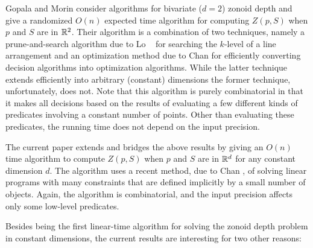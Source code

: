 \documentclass[lotsofwhite]{patmorin}
\begin{document}
Gopala and Morin \cite{gm06} consider algorithms for bivariate ($d=2$)
zonoid depth and give a randomized $O(n)$ expected time algorithm for
computing $Z(p,S)$ when $p$ and $S$ are in $\mathbb{R}^2$.  Their algorithm is
a combination of two techniques, namely a prune-and-search algorithm
due to Lo \etal\ \cite{lms94} for searching the $k$-level of a line
arrangement and an optimization method due to Chan \cite{c99} for
efficiently converting decision algorithms into optimization
algorithms.   While the latter technique extends efficiently into
arbitrary (constant) dimensions \cite{c04} the former technique,
unfortunately, does not.  Note that this algorithm is purely
combinatorial in that it makes all decisions based on the results of
evaluating a few different kinds of predicates involving a constant
number of points. Other than evaluating these predicates, the running
time does not depend on the input precision.

The current paper extends and bridges the above results by giving an
$O(n)$ time algorithm to compute $Z(p,S)$ when $p$ and $S$ are in
$\mathbb{R}^d$ for any constant dimension $d$.  The algorithm uses a recent
method, due to Chan \cite{c04}, of solving linear programs with many
constraints that are defined implicitly by a small number of objects.
Again, the algorithm is combinatorial, and the input precision affects
only some low-level predicates.

Besides being the first linear-time algorithm for solving the zonoid
depth problem in constant dimensions, the current results are
interesting for two other reasons:
\end{document}
